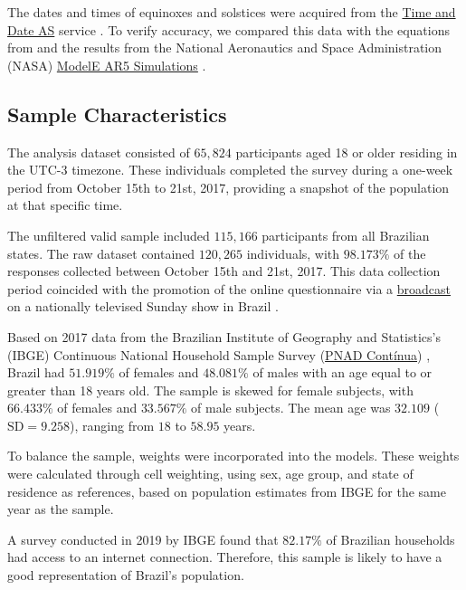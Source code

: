 \documentclass[
12pt,
openright,
oneside,
a4paper,
chapter=TITLE,
section=TITLE,
french,
spanish,
brazil,
english
]{abntex2}
\begin{document}
The dates and times of equinoxes and solstices were acquired from the
\href{https://www.timeanddate.com/calendar/seasons.html?year=2000&n=1440}{Time
and Date AS} service \autocite{timeanddateas}. To verify accuracy, we
compared this data with the equations from \textcite{meeus1991} and the
results from the National Aeronautics and Space Administration (NASA)
\href{https://data.giss.nasa.gov/modelE/ar5plots/srvernal.html}{ModelE
AR5 Simulations} \autocite{nasa}.

\subsection{Sample Characteristics}\label{sample-characteristics}

The analysis dataset consisted of \(65,824\) participants aged 18 or
older residing in the UTC-3 timezone. These individuals completed the
survey during a one-week period from October 15th to 21st, 2017,
providing a snapshot of the population at that specific time.

The unfiltered valid sample included \(115,166\) participants from all
Brazilian states. The raw dataset contained \(120,265\) individuals,
with \(98.173\%\) of the responses collected between October 15th and
21st, 2017. This data collection period coincided with the promotion of
the online questionnaire via a
\href{https://globoplay.globo.com/v/6219513/}{broadcast} on a nationally
televised Sunday show in Brazil \autocite{redeglobo2017}.

Based on 2017 data from the Brazilian Institute of Geography and
Statistics's (IBGE) Continuous National Household Sample Survey
(\href{https://www.ibge.gov.br/estatisticas/sociais/trabalho/17270-pnad-continua.html}{PNAD
Contínua}) \autocite{ibgee}, Brazil had \(51.919\%\) of females and
\(48.081\%\) of males with an age equal to or greater than 18 years old.
The sample is skewed for female subjects, with \(66.433\%\) of females
and \(33.567\%\) of male subjects. The mean age was \(32.109\)
(\(\text{SD} = 9.258\)), ranging from \(18\) to \(58.95\) years.

To balance the sample, weights were incorporated into the models. These
weights were calculated through cell weighting, using sex, age group,
and state of residence as references, based on population estimates from
IBGE for the same year as the sample.

A survey conducted in 2019 by IBGE \autocite*{ibge2021} found that
\(82.17\%\) of Brazilian households had access to an internet
connection. Therefore, this sample is likely to have a good
representation of Brazil's population.
\end{document}

